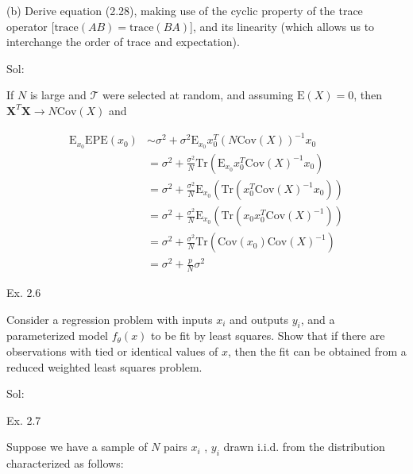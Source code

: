 \documentclass[english]{article}\usepackage[]{graphicx}\usepackage[]{color}
\begin{document}
\vspace{0.5cm}

(b) Derive equation (2.28), making use of the cyclic property of the
trace operator {[}$\mathrm{trace}(AB)=\mathrm{trace}(BA)${]}, and
its linearity (which allows us to interchange the order of trace and
expectation).

\vspace{0.5cm}

Sol:

If $N$ is large and $\mathcal{T}$ were selected at random, and assuming
$\mathrm{E}(X)=0$, then $\boldsymbol{X}^{T}\boldsymbol{X}\rightarrow N\mathrm{Cov}(X)$
and

\begin{align*}
\mathrm{E}_{x_{0}}\mathrm{EPE}(x_{0}) & \sim\sigma^{2}+\sigma^{2}\mathrm{E}_{x_{0}}x_{0}^{T}(N\mathrm{Cov}(X))^{-1}x_{0}\\
 & =\sigma^{2}+\frac{\sigma^{2}}{N}\mathrm{Tr}(\mathrm{E}_{x_{0}}x_{0}^{T}\mathrm{Cov}(X)^{-1}x_{0})\\
 & =\sigma^{2}+\frac{\sigma^{2}}{N}\mathrm{E}_{x_{0}}(\mathrm{Tr}(x_{0}^{T}\mathrm{Cov}(X)^{-1}x_{0}))\\
 & =\sigma^{2}+\frac{\sigma^{2}}{N}\mathrm{E}_{x_{0}}(\mathrm{Tr}(x_{0}x_{0}^{T}\mathrm{Cov}(X)^{-1}))\\
 & =\sigma^{2}+\frac{\sigma^{2}}{N}\mathrm{Tr}(\mathrm{Cov}(x_{0})\mathrm{Cov}(X)^{-1})\\
 & =\sigma^{2}+\frac{p}{N}\sigma^{2}
\end{align*}

\vspace{0.5cm}

Ex. 2.6

\vspace{0.5cm}

Consider a regression problem with inputs $x_{i}$ and outputs $y_{i}$,
and a parameterized model $f_{\theta}(x)$ to be fit by least squares.
Show that if there are observations with tied or identical values
of $x$, then the fit can be obtained from a reduced weighted least
squares problem.

\vspace{0.5cm}

Sol:

\vspace{0.5cm}

Ex. 2.7

\vspace{0.5cm}

Suppose we have a sample of $N$ pairs $x_{i}$ , $y_{i}$ drawn i.i.d.
from the distribution characterized as follows:
\end{document}
